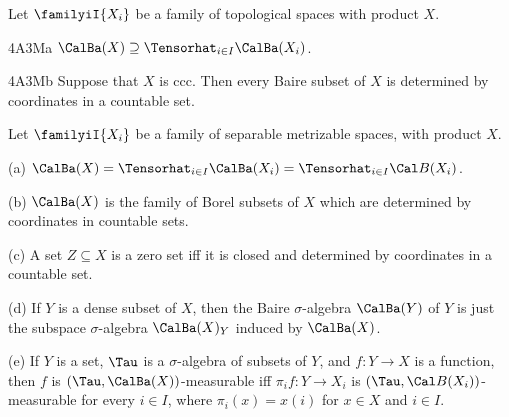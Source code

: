  Let $\familyiI{X_i}$ be a family of
topological spaces with product $X$.

\spheader 4A3Ma $\CalBa(X)\supseteq\Tensorhat_{i\in I}\CalBa(X_i)$.

\spheader 4A3Mb Suppose that $X$ is ccc.   Then every Baire subset of
$X$ is determined by coordinates in a countable set.

 Let
$\familyiI{X_i}$ be a family of separable metrizable spaces, with
product $X$.

(a) $\CalBa(X)=\Tensorhat_{i\in I}\CalBa(X_i)
=\Tensorhat_{i\in I}\Cal B(X_i)$.

(b) $\CalBa(X)$ is the family of Borel subsets of $X$ which are
determined by coordinates in countable sets.

(c) A set $Z\subseteq X$ is a zero set iff it is closed and
determined by coordinates in a countable set.

(d) If $Y$ is a dense subset of $X$, then the Baire
$\sigma$-algebra $\CalBa(Y)$ of $Y$ is just the subspace
$\sigma$-algebra $\CalBa(X)_Y$ induced by $\CalBa(X)$.

(e) If $Y$ is a set, $\Tau$ is a $\sigma$-algebra of subsets of $Y$, and
$f:Y\to X$ is a function, then $f$ is $(\Tau,\CalBa(X))$-measurable iff
$\pi_if:Y\to X_i$ is $(\Tau,\Cal B(X_i))$-measurable for every $i\in I$,
where $\pi_i(x)=x(i)$ for $x\in X$ and $i\in I$.


